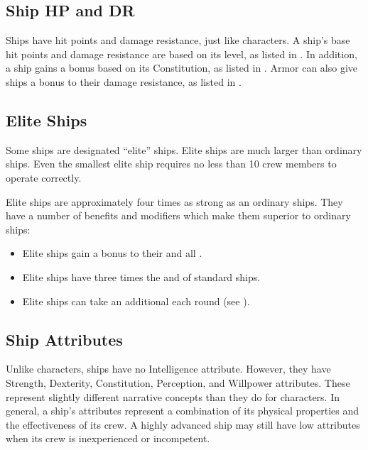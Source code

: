     \subsection{Ship HP and DR}
        Ships have hit points and damage resistance, just like characters.
        A ship's base hit points and damage resistance are based on its level, as listed in .
        In addition, a ship gains a bonus based on its Constitution, as listed in .
        Armor can also give ships a bonus to their damage resistance, as listed in .

    \subsection{Elite Ships}\label{Elite Ships}
        Some ships are designated ``elite'' ships.
        Elite ships are much larger than ordinary ships.
        Even the smallest elite ship requires no less than 10 crew members to operate correctly.

        Elite ships are approximately four times as strong as an ordinary ships.
        They have a number of benefits and modifiers which make them superior to ordinary ships:
        \begin{itemize}
            \item Elite ships gain a  bonus to their  and all .
            \item Elite ships have three times the  and  of standard ships.
            \item Elite ships can take an additional  each round (see ).
        \end{itemize}

    \subsection{Ship Attributes}
        Unlike characters, ships have no Intelligence attribute.
        However, they have Strength, Dexterity, Constitution, Perception, and Willpower attributes.
        These represent slightly different narrative concepts than they do for characters.
        In general, a ship's attributes represent a combination of its physical properties and the effectiveness of its crew.
        A highly advanced ship may still have low attributes when its crew is inexperienced or incompetent.

